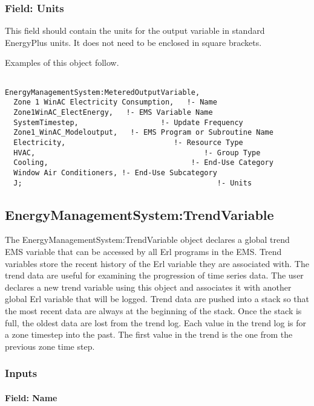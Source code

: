 \subsubsection{Field: Units}\label{field-units-1}

This field should contain the units for the output variable in standard EnergyPlus units. It does not need to be enclosed in square brackets.

Examples of this object follow.

\begin{lstlisting}

EnergyManagementSystem:MeteredOutputVariable,
  Zone 1 WinAC Electricity Consumption,   !- Name
  Zone1WinAC_ElectEnergy,   !- EMS Variable Name
  SystemTimestep,                   !- Update Frequency
  Zone1_WinAC_Modeloutput,   !- EMS Program or Subroutine Name
  Electricity,                         !- Resource Type
  HVAC,                                       !- Group Type
  Cooling,                                 !- End-Use Category
  Window Air Conditioners, !- End-Use Subcategory
  J;                                             !- Units
\end{lstlisting}

\subsection{EnergyManagementSystem:TrendVariable}\label{energymanagementsystemtrendvariable}

The EnergyManagementSystem:TrendVariable object declares a global trend EMS variable that can be accessed by all Erl programs in the EMS. Trend variables store the recent history of the Erl variable they are associated with. The trend data are useful for examining the progression of time series data. The user declares a new trend variable using this object and associates it with another global Erl variable that will be logged. Trend data are pushed into a stack so that the most recent data are always at the beginning of the stack. Once the stack is full, the oldest data are lost from the trend log. Each value in the trend log is for a zone timestep into the past. The first value in the trend is the one from the previous zone time step.

\subsubsection{Inputs}\label{inputs-7-008}

\paragraph{Field: Name}\label{field-name-7-005}

